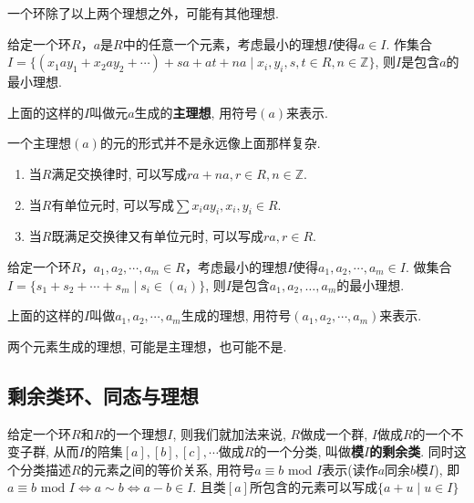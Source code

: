 \begin{Note}
一个环除了以上两个理想之外，可能有其他理想.
\end{Note}

\begin{Proposition}
给定一个环$R$，$a$是$R$中的任意一个元素，考虑最小的理想$I$使得$a \in I$. 作集合
$I = \{ \left( x_1 a y_1 + x_2 a y_2 + \cdots \right) + s a + a t + na \mid
x_i, y_i, s, t \in R, n \in \mathbb{Z} \}$, 则$I$是包含$a$的最小理想.
\end{Proposition}

\begin{Definition}[主理想]
上面的这样的$I$叫做元$a$生成的\textbf{主理想}, 用符号$(a)$来表示.
\end{Definition}

\begin{Note}
一个主理想$(a)$的元的形式并不是永远像上面那样复杂.
\begin{enumerate}
	\item 当$R$满足交换律时, 可以写成$ra + na, r \in R, n \in \mathbb{Z}$.
	\item 当$R$有单位元时, 可以写成$ \displaystyle \sum x_i a y_i, x_i, y_i \in R $.

	\item 当$R$既满足交换律又有单位元时, 可以写成$ \displaystyle ra, r \in R $.
\end{enumerate}
\end{Note}

\begin{Proposition}
给定一个环$R$，$a_1, a_2, \cdots, a_m \in R$，考虑最小的理想$I$使得$a_1, a_2, \cdots, a_m \in I$.
做集合$I = \{ s_1 + s_2 + \cdots + s_m \mid s_i \in (a_i) \}$, 
则$I$是包含$a_1, a_2, \dots, a_m$的最小理想.
\end{Proposition}

\begin{Definition}
上面的这样的$I$叫做$a_1, a_2, \cdots, a_m$生成的理想, 用符号$(a_1, a_2, \cdots, a_m)$来表示.
\end{Definition}

\begin{Note}
两个元素生成的理想, 可能是主理想，也可能不是.
\end{Note}

\subsection{剩余类环、同态与理想}

\begin{Note}
给定一个环$R$和$R$的一个理想$I$, 则我们就加法来说, $R$做成一个群, $I$做成$R$的一个不变子群, 从而$I$的陪集$[a], [b], [c], \cdots$做成$R$的一个分类, 叫做\textbf{模$I$的剩余类}. 同时这个分类描述$R$的元素之间的等价关系, 用符号$a \equiv b \text{ mod } I$表示(读作$a$同余$b$模$I$), 即$a \equiv b \text{ mod } I \Leftrightarrow a \sim b \Leftrightarrow a - b \in I$. 且类$[a]$所包含的元素可以写成$\{ a + u \mid u \in I \}$
\end{Note}

